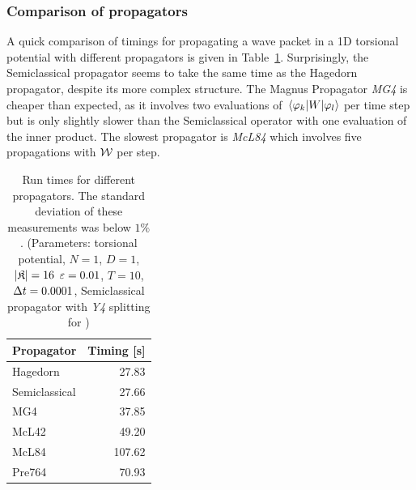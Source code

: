 \subsubsection{Comparison of propagators}
%
A quick comparison of timings for propagating a wave packet in a 1D torsional potential with different propagators is given in Table~\ref{tab:comparison}.
Surprisingly, the Semiclassical propagator seems to take the same time as the Hagedorn propagator, despite its more complex structure.
The Magnus Propagator \emph{MG4} is cheaper than expected, as it involves two evaluations of $\matrixel{\varphi_k}{W}{\varphi_l}$ per time step but is only slightly slower than the Semiclassical operator with one evaluation of the inner product.
The slowest propagator is \emph{McL84} which involves five propagations with $\mathcal{W}$ per step.
%
\begin{table}[ht]
	\centering
	\begin{tabular}{|l | r |} 
		\hline
		\multicolumn{1}{|c}{\textbf{Propagator}} &
		\multicolumn{1}{|c|}{\textbf{Timing [s]}} \\
		\hline
		Hagedorn & 27.83 \\
		Semiclassical & 27.66 \\
		MG4 & 37.85 \\
		McL42 & 49.20 \\
		McL84 & 107.62 \\
		Pre764 & 70.93 \\
		\hline
	\end{tabular}
	\caption{Run times for different propagators. The standard deviation of these measurements was below $1\%$.
	(Parameters: torsional potential, $N=1$, $D=1$, $|\mathfrak{K}|=16$ $\varepsilon=0.01$, $T=10$, $\Delta t=0.0001$, Semiclassical propagator with \emph{Y4} splitting for ) }
	\label{tab:comparison}
\end{table}


